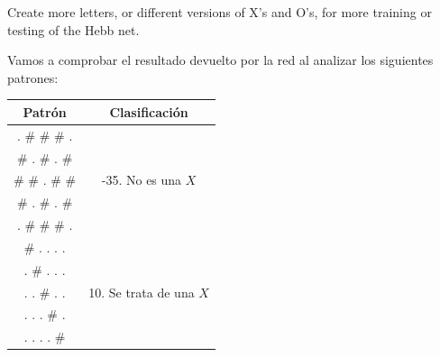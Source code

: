 \begin{problem}[4]
Create more letters, or different versions of X's and O's, for more training or testing
of the Hebb net.

\solution

Vamos a comprobar el resultado devuelto por la red al analizar los siguientes patrones:

\begin{center}
\begin{tabular}{|c|c|}
\hline
\textbf{Patrón} & \textbf{Clasificación} \\
\hline
 . \# \# \#  . & \\
\#  . \#  . \# & \\
\# \#  . \# \# & -35. No es una $X$\\
\#  . \#  . \# & \\
 . \# \# \#  . & \\
\hline
\#  .  .  .  . & \\
 . \#  .  .  . & \\
 .  . \#  .  . & 10. Se trata de una $X$ \\
 .  .  . \#  . & \\
 .  .  .  . \# & \\
\hline
\end{tabular}
\end{center}

\end{problem}

